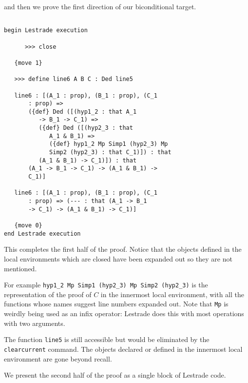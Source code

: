 \documentclass[12pt]{article}
\begin{document}
and then we prove the first direction of our biconditional target.

\begin{verbatim}

begin Lestrade execution

      >>> close

   {move 1}

   >>> define line6 A B C : Ded line5

   line6 : [(A_1 : prop), (B_1 : prop), (C_1 
       : prop) => 
       ({def} Ded ([(hyp1_2 : that A_1 
          -> B_1 -> C_1) => 
          ({def} Ded ([(hyp2_3 : that 
             A_1 & B_1) => 
             ({def} hyp1_2 Mp Simp1 (hyp2_3) Mp 
             Simp2 (hyp2_3) : that C_1)]) : that 
          (A_1 & B_1) -> C_1)]) : that 
       (A_1 -> B_1 -> C_1) -> (A_1 & B_1) -> 
       C_1)]

   line6 : [(A_1 : prop), (B_1 : prop), (C_1 
       : prop) => (--- : that (A_1 -> B_1 
       -> C_1) -> (A_1 & B_1) -> C_1)]

   {move 0}
end Lestrade execution

\end{verbatim}

This completes the first half of the proof.  Notice that the objects defined in the local environments which are closed
have been expanded out so they are not mentioned.  

For example \verb|hyp1_2 Mp Simp1 (hyp2_3) Mp Simp2 (hyp2_3)| is the representation of the proof of $C$ in the innermost local environment, with all the functions whose names suggest line numbers expanded out.  Note that {\tt Mp}
is weirdly being used as an infix operator:  Lestrade does this with most operations with two arguments.

The function {\tt line5} is still accessible but would be eliminated
by the {\tt clearcurrent} command.  The objects declared or defined in the innermost local environment are gone beyond recall.

We present the second half of the proof as a single block of Lestrade code.
\end{document}
